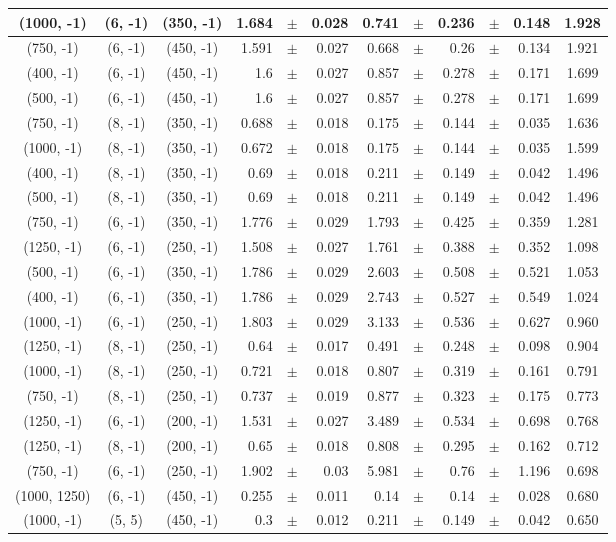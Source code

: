 \documentclass[12pt]{paper}
\begin{document}
\begin{table}[ht]
\begin{center}
{\begin{tabular}{|c|c|c|rrr|rrrrr|c|}
(1000, -1)&(6, -1)&(350, -1)&1.684&$\pm$&0.028&0.741&$\pm$&0.236&$\pm$&0.148&1.928\\\hline
(750, -1)&(6, -1)&(450, -1)&1.591&$\pm$&0.027&0.668&$\pm$&0.26&$\pm$&0.134&1.921\\\hline
(400, -1)&(6, -1)&(450, -1)&1.6&$\pm$&0.027&0.857&$\pm$&0.278&$\pm$&0.171&1.699\\\hline
(500, -1)&(6, -1)&(450, -1)&1.6&$\pm$&0.027&0.857&$\pm$&0.278&$\pm$&0.171&1.699\\\hline
(750, -1)&(8, -1)&(350, -1)&0.688&$\pm$&0.018&0.175&$\pm$&0.144&$\pm$&0.035&1.636\\\hline
(1000, -1)&(8, -1)&(350, -1)&0.672&$\pm$&0.018&0.175&$\pm$&0.144&$\pm$&0.035&1.599\\\hline
(400, -1)&(8, -1)&(350, -1)&0.69&$\pm$&0.018&0.211&$\pm$&0.149&$\pm$&0.042&1.496\\\hline
(500, -1)&(8, -1)&(350, -1)&0.69&$\pm$&0.018&0.211&$\pm$&0.149&$\pm$&0.042&1.496\\\hline
(750, -1)&(6, -1)&(350, -1)&1.776&$\pm$&0.029&1.793&$\pm$&0.425&$\pm$&0.359&1.281\\\hline
(1250, -1)&(6, -1)&(250, -1)&1.508&$\pm$&0.027&1.761&$\pm$&0.388&$\pm$&0.352&1.098\\\hline
(500, -1)&(6, -1)&(350, -1)&1.786&$\pm$&0.029&2.603&$\pm$&0.508&$\pm$&0.521&1.053\\\hline
(400, -1)&(6, -1)&(350, -1)&1.786&$\pm$&0.029&2.743&$\pm$&0.527&$\pm$&0.549&1.024\\\hline
(1000, -1)&(6, -1)&(250, -1)&1.803&$\pm$&0.029&3.133&$\pm$&0.536&$\pm$&0.627&0.960\\\hline
(1250, -1)&(8, -1)&(250, -1)&0.64&$\pm$&0.017&0.491&$\pm$&0.248&$\pm$&0.098&0.904\\\hline
(1000, -1)&(8, -1)&(250, -1)&0.721&$\pm$&0.018&0.807&$\pm$&0.319&$\pm$&0.161&0.791\\\hline
(750, -1)&(8, -1)&(250, -1)&0.737&$\pm$&0.019&0.877&$\pm$&0.323&$\pm$&0.175&0.773\\\hline
(1250, -1)&(6, -1)&(200, -1)&1.531&$\pm$&0.027&3.489&$\pm$&0.534&$\pm$&0.698&0.768\\\hline
(1250, -1)&(8, -1)&(200, -1)&0.65&$\pm$&0.018&0.808&$\pm$&0.295&$\pm$&0.162&0.712\\\hline
(750, -1)&(6, -1)&(250, -1)&1.902&$\pm$&0.03&5.981&$\pm$&0.76&$\pm$&1.196&0.698\\\hline
(1000, 1250)&(6, -1)&(450, -1)&0.255&$\pm$&0.011&0.14&$\pm$&0.14&$\pm$&0.028&0.680\\\hline
(1000, -1)&(5, 5)&(450, -1)&0.3&$\pm$&0.012&0.211&$\pm$&0.149&$\pm$&0.042&0.650\\\hline

\end{tabular}}
\end{center}
\end{table}
\end{document}
